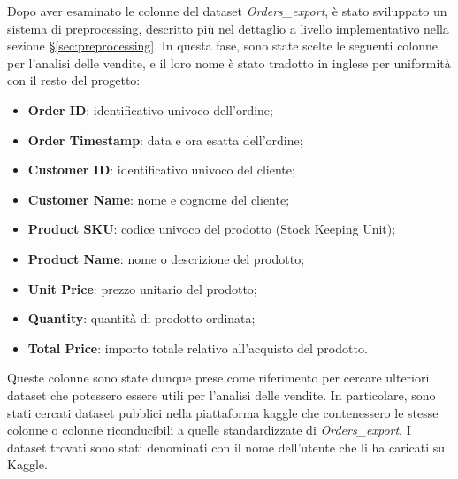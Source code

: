 Dopo aver esaminato le colonne del dataset \emph{Orders\_export}, è stato sviluppato un sistema di preprocessing, descritto più nel dettaglio a livello implementativo nella sezione \S\ref{sec:preprocessing}. In questa fase, sono state scelte le seguenti colonne per l'analisi delle vendite, e il loro nome è stato tradotto in inglese per uniformità con il resto del progetto:
\begin{itemize}
    \item \textbf{Order ID}: identificativo univoco dell'ordine;
    \item \textbf{Order Timestamp}: data e ora esatta dell'ordine;
    \item \textbf{Customer ID}: identificativo univoco del cliente;
    \item \textbf{Customer Name}: nome e cognome del cliente;
    \item \textbf{Product SKU}: codice univoco del prodotto (Stock Keeping Unit);
    \item \textbf{Product Name}: nome o descrizione del prodotto;
    \item \textbf{Unit Price}: prezzo unitario del prodotto;
    \item \textbf{Quantity}: quantità di prodotto ordinata;
    \item \textbf{Total Price}: importo totale relativo all'acquisto del prodotto.
\end{itemize}

Queste colonne sono state dunque prese come riferimento per cercare ulteriori dataset che potessero essere utili per l'analisi delle vendite. In particolare, sono stati cercati dataset pubblici nella piattaforma \gls{kaggle} che contenessero le stesse colonne o colonne riconducibili a quelle standardizzate di \emph{Orders\_export}. I dataset trovati sono stati denominati con il nome dell'utente che li ha caricati su Kaggle.

